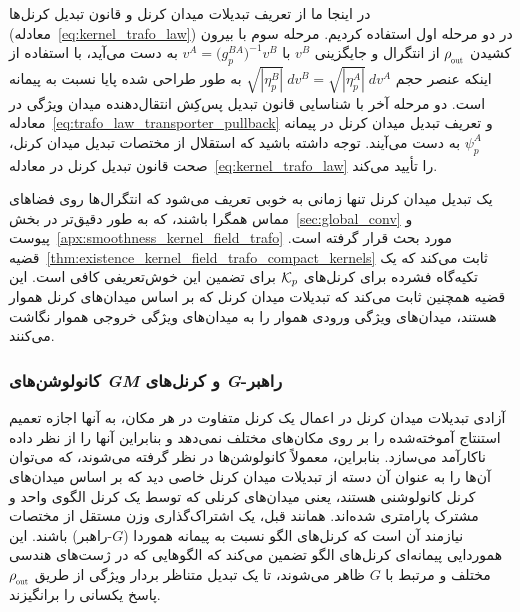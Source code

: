 در اینجا ما از تعریف تبدیلات میدان کرنل و قانون تبدیل کرنل‌ها (معادله~\eqref{eq:kernel_trafo_law}) در دو مرحله اول استفاده کردیم.
مرحله سوم با بیرون کشیدن $\rhoout$ از انتگرال و جایگزینی $v^B$ با $v^A = \big(g_p^{BA}\big)^{-1} v^B$ به دست می‌آید، با استفاده از اینکه عنصر حجم $\sqrt{|\eta_p^B|}\ dv^B = \sqrt{|\eta_p^A|}\ dv^A$ به طور طراحی شده پایا نسبت به پیمانه است.
دو مرحله آخر با شناسایی قانون تبدیل پس‌کِش انتقال‌دهنده میدان ویژگی در معادله~\eqref{eq:trafo_law_transporter_pullback} و تعریف تبدیل میدان کرنل در پیمانه $\psi_p^A$ به دست می‌آیند.
توجه داشته باشید که استقلال از مختصات تبدیل میدان کرنل، صحت قانون تبدیل کرنل در معادله~\eqref{eq:kernel_trafo_law} را تأیید می‌کند.

یک تبدیل میدان کرنل تنها زمانی به خوبی تعریف می‌شود که انتگرال‌ها روی فضاهای مماس همگرا باشند، که به طور دقیق‌تر در بخش~\ref{sec:global_conv} و پیوست~\ref{apx:smoothness_kernel_field_trafo} مورد بحث قرار گرفته است.
قضیه~\ref{thm:existence_kernel_field_trafo_compact_kernels} ثابت می‌کند که یک تکیه‌گاه فشرده برای کرنل‌های $\mathcal{K}_p$ برای تضمین این خوش‌تعریفی کافی است.
این قضیه همچنین ثابت می‌کند که تبدیلات میدان کرنل که بر اساس میدان‌های کرنل هموار هستند، میدان‌های ویژگی ورودی هموار را به میدان‌های ویژگی خروجی هموار نگاشت می‌کنند.

\subsubsection{کانولوشن‌های \textit{GM} و کرنل‌های \textit{G}-راهبر}
\label{sec:gauge_conv}

آزادی تبدیلات میدان کرنل در اعمال یک کرنل متفاوت در هر مکان، به آنها اجازه تعمیم استنتاج آموخته‌شده را بر روی مکان‌های مختلف نمی‌دهد و بنابراین آنها را از نظر داده ناکارآمد می‌سازد.
بنابراین، معمولاً کانولوشن‌ها در نظر گرفته می‌شوند، که می‌توان آن‌ها را به عنوان آن دسته از تبدیلات میدان کرنل خاصی دید که بر اساس میدان‌های کرنل کانولوشنی هستند، یعنی میدان‌های کرنلی که توسط یک کرنل الگوی واحد و مشترک پارامتری شده‌اند.
همانند قبل، یک اشتراک‌گذاری وزن مستقل از مختصات نیازمند آن است که کرنل‌های الگو نسبت به پیمانه هموردا ($G$-راهبر) باشند.
این هموردایی پیمانه‌ای کرنل‌های الگو تضمین می‌کند که الگوهایی که در ژست‌های هندسی مختلف و مرتبط با $G$ ظاهر می‌شوند، تا یک تبدیل متناظر بردار ویژگی از طریق $\rhoout$ پاسخ یکسانی را برانگیزند.

